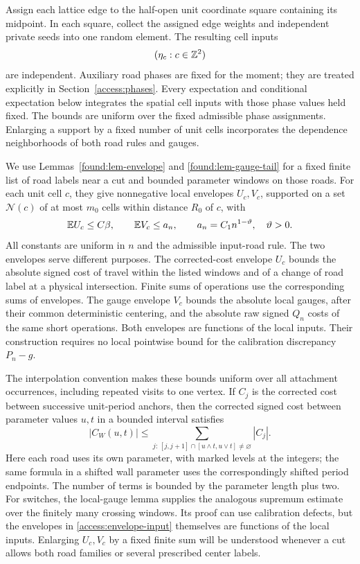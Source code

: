 Assign each lattice edge to the half-open unit coordinate square
containing its midpoint.  In each square, collect the assigned edge
weights and independent private seeds into one random element.  The
resulting cell inputs
\[
             (\eta_c:c\in\mathbb Z^2)
\]
are independent.  Auxiliary road phases are fixed for the moment; they
are treated explicitly in Section~\ref{access:phases}. Every expectation
and conditional expectation below integrates the spatial cell inputs
with those phase values held fixed. The bounds are uniform over the
fixed admissible phase assignments. Enlarging a support
by a fixed number of unit cells incorporates the dependence neighborhoods
of both road rules and gauges.

We use Lemmas~\ref{found:lem-envelope} and
\ref{found:lem-gauge-tail} for a fixed finite list of road labels near a
cut and bounded parameter windows on those roads.  For each unit cell
$c$, they give nonnegative local envelopes $U_c,V_c$, supported on a
set $\mathcal N(c)$ of at most $m_0$ cells within distance $R_0$ of $c$,
with
\begin{equation}\label{access:envelope-input}
 \mathbb E U_c\le C\beta,
 \qquad \mathbb E V_c\le a_n,
 \qquad a_n=C_1n^{1-\vartheta},\quad \vartheta>0.
\end{equation}
All constants are uniform in $n$ and the admissible input-road rule.
The two envelopes serve different purposes.  The corrected-cost envelope
$U_c$ bounds the absolute signed cost of travel within the listed windows
and of a change of road label at a physical intersection.  Finite sums
of operations use the corresponding sums of envelopes.  The gauge
envelope $V_c$ bounds the absolute local gauges, after their common
deterministic centering, and the absolute raw signed $Q_n$ costs of the
same short operations.  Both envelopes are functions of the local
inputs.  Their construction requires no local pointwise bound for the
calibration discrepancy $P_n-g$.

The interpolation convention makes these bounds uniform over all
attachment occurrences, including repeated visits to one vertex.  If
$C_j$ is the corrected cost between
successive unit-period anchors, then the corrected signed cost between
parameter values $u,t$ in a bounded interval satisfies
\begin{equation}\label{access:interpolation-envelope}
 |C_W(u,t)|\le
 \sum_{j:\,[j,j+1]\cap [u\wedge t,u\vee t]\ne\varnothing}|C_j|.
\end{equation}
Here each road uses its own parameter, with marked levels at the
integers; the same formula in a shifted wall parameter uses the
correspondingly shifted period endpoints. The number of terms is
bounded by the parameter length plus two. For
switches, the local-gauge lemma supplies the analogous supremum estimate
over the finitely many crossing windows.  Its proof can use calibration
defects, but the envelopes in \eqref{access:envelope-input} themselves are
functions of the local inputs.  Enlarging $U_c,V_c$ by a fixed finite sum
will be understood whenever a cut allows both road families or several
prescribed center labels.

